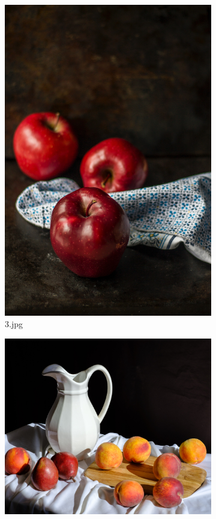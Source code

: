 \begin{figure}[htb]
\medskip
\begin{subfigure}{0.25\textwidth}
  \includegraphics[width=\linewidth]{../images/3.jpg}
  \caption*{3.jpg}
  \label{fig:3jpg}
\end{subfigure}\hfil %
\begin{subfigure}{0.25\textwidth}
  \includegraphics[width=\linewidth]{../images/4.jpg}

\end{subfigure}
\end{figure}
